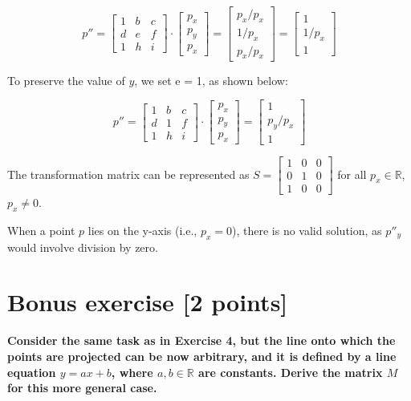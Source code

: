 \documentclass{article}
\begin{document}
\[
    p'' = \begin{bmatrix} 1 & b & c \\ d & e & f \\ 1 & h & i \end{bmatrix} \cdot \begin{bmatrix} p_x \\ p_y \\ p_x \end{bmatrix} = \begin{bmatrix} p_x/p_x \\ 1/p_x \\ p_x / p_x \end{bmatrix} = \begin{bmatrix} 1 \\ 1 / p_x \\ 1 \end{bmatrix}
\]

To preserve the value of $y$, we set e = 1, as shown below:

\[
    p'' = \begin{bmatrix} 1 & b & c \\ d & 1 & f \\ 1 & h & i \end{bmatrix} \cdot \begin{bmatrix} p_x \\ p_y \\ p_x \end{bmatrix} = \begin{bmatrix} 1 \\ p_y / p_x \\ 1 \end{bmatrix}
\]

The transformation matrix can be represented as $ S = \begin{bmatrix} 1 & 0 & 0 \\ 0 & 1 & 0 \\ 1 & 0 & 0 \end{bmatrix} $ for all $p_x \in \mathbb{R}$, $p_x \neq 0$.

When a point $p$ lies on the y-axis (i.e., $p_x = 0$), there is no valid solution, as $p''_y$ would involve division by zero.




\section*{Bonus exercise [2 points]}

\textbf{Consider the same task as in Exercise 4, but the line onto which the points are projected can be now arbitrary,
    and it is defined by a line equation $y = ax + b$, where $a, b \in \mathbb{R}$ are constants. Derive the matrix $M$ for this
    more general case.} \\
\end{document}

